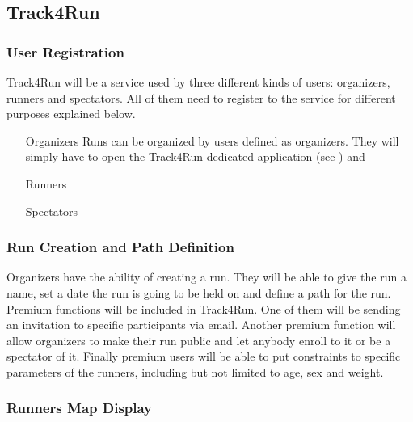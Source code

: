 \documentclass[../../rasd.tex]{subfiles}
\begin{document}
			\subsection{Track4Run}
				\subsubsection{User Registration}
				Track4Run will be a service used by three different kinds of users: organizers, runners and spectators. All of them need to register to the service for different purposes explained below.
				\begin{itemize}
					\item[Organizers]
					Runs can be organized by users defined as organizers. They will simply have to open the Track4Run dedicated application (see ) and

					\item[Runners]
					\item[Spectators]
				\end{itemize}
				\subsubsection{Run Creation and Path Definition}
				Organizers have the ability of creating a run. They will be able to give the run a name, set a date the run is going to be held on and define a path for the run. Premium functions will be included in Track4Run. One of them will be sending an invitation to specific participants via email. Another premium function will allow organizers to make their run public and let anybody enroll to it or be a spectator of it. Finally premium users will be able to put constraints to specific parameters of the runners, including but not limited to age, sex and weight.
				\subsubsection{Runners Map Display}
\end{document}
